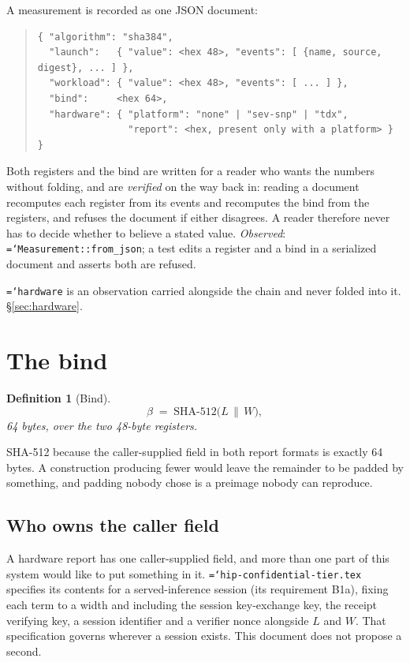 \documentclass[11pt,a4paper]{article}
\newtheorem{definition}{Definition}[section]
\newcommand{\code}[1]{\texttt{\hyphenchar\font=`\-\relax #1}}
\newcommand{\sha}[1]{\mathrm{SHA\text{-}#1}}
\begin{document}
A measurement is recorded as one JSON document:

\begin{quote}\small
\begin{verbatim}
{ "algorithm": "sha384",
  "launch":   { "value": <hex 48>, "events": [ {name, source, digest}, ... ] },
  "workload": { "value": <hex 48>, "events": [ ... ] },
  "bind":     <hex 64>,
  "hardware": { "platform": "none" | "sev-snp" | "tdx",
                "report": <hex, present only with a platform> } }
\end{verbatim}
\end{quote}

Both registers and the bind are written for a reader who wants the numbers
without folding, and are \emph{verified} on the way back in: reading a document
recomputes each register from its events and recomputes the bind from the
registers, and refuses the document if either disagrees. A reader therefore never
has to decide whether to believe a stated value. \emph{Observed}:
\code{Measurement::from\_json}; a test edits a register and a bind in a serialized
document and asserts both are refused.

\code{hardware} is an observation carried alongside the chain and never folded
into it. \S\ref{sec:hardware}.

\section{The bind}
\label{sec:bind}

\begin{definition}[Bind]
\[
  \beta \;=\; \sha{512}\bigl(L \,\|\, W\bigr),
\]
64 bytes, over the two 48-byte registers.
\end{definition}

SHA-512 because the caller-supplied field in both report formats is exactly 64
bytes. A construction producing fewer would leave the remainder to be padded by
something, and padding nobody chose is a preimage nobody can reproduce.

\subsection{Who owns the caller field}
\label{sec:field}

A hardware report has one caller-supplied field, and more than one part of this
system would like to put something in it. \code{hip-confidential-tier.tex}
specifies its contents for a served-inference session (its requirement B1a),
fixing each term to a width and including the session key-exchange key, the
receipt verifying key, a session identifier and a verifier nonce alongside $L$ and
$W$. That specification governs wherever a session exists. This document does not
propose a second.
\end{document}
